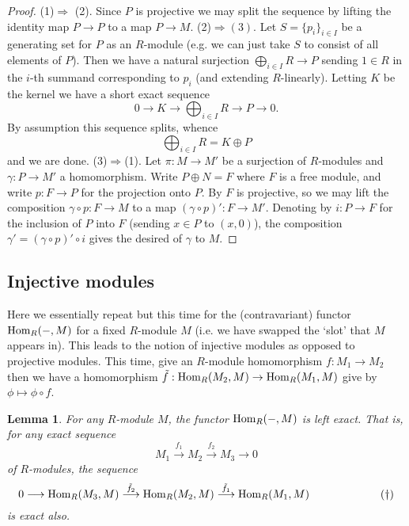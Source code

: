 \documentclass[11pt]{amsart}
\numberwithin{equation}{section}
\newtheorem{lemma}[equation]{Lemma}
\theoremstyle{remark}
\theoremstyle{remark}
\theoremstyle{remark}
\theoremstyle{definition}
\theoremstyle{definition}
\theoremstyle{definition}
\theoremstyle{definition}
\theoremstyle{definition}
\theoremstyle{definition}
\begin{document}
\begin{proof}
(1)$\Rightarrow$ (2).  Since $P$ is projective we may split the sequence by lifting the identity map $P\rightarrow P$ to a map $P\rightarrow M$. (2)$\Rightarrow (3)$. Let $S=\{p_i\}_{i\in I}$ be a generating set for $P$ as an $R$-module (e.g. we can just take $S$ to consist of all elements of $P$). Then we have a natural surjection $\bigoplus_{i\in I}R\rightarrow P$ sending  $1\in R$ in the $i$-th summand corresponding to $p_i$ (and extending $R$-linearly). Letting $K$ be the kernel we have a short exact sequence
\[0\rightarrow K \rightarrow \bigoplus_{i\in I}R \rightarrow P\rightarrow 0.\]
By assumption this sequence splits, whence 
\[\bigoplus_{i\in I}R=K\oplus P\]
and we are done. (3)$\Rightarrow$(1). Let $\pi:M\rightarrow M'$ be a surjection of $R$-modules and  $\gamma:P\rightarrow M'$ a homomorphism.  Write $P\oplus N=F$ where $F$ is a free module, and write $p:F\rightarrow P$ for the projection onto $P$. By  $F$ is projective, so we may lift the composition $\gamma \circ p:F\rightarrow M$ to a map $(\gamma \circ p)':F\rightarrow M'$. Denoting by $i:P\rightarrow  F$ for the inclusion of $P$ into $F$ (sending $x\in P$ to $(x,0)$), the composition $\gamma'=(\gamma \circ p)'\circ i$ gives the desired of $\gamma$ to $M$.
\end{proof}

\subsection{Injective modules}

Here we essentially repeat   but this time for the (contravariant) functor $\textup{Hom}_R(-,M)$ for a fixed $R$-module $M$ (i.e. we have swapped the `slot' that $M$ appears in). This leads to the notion of injective modules as opposed to projective modules. This time, give an $R$-module homomorphism $f:M_1\rightarrow M_2$ then we have a homomorphism
$\tilde{f}:\textup{Hom}_R(M_2,M)\rightarrow \textup{Hom}_R(M_1,M)$ give by $\phi \mapsto \phi \circ f$.

\begin{lemma}
For any $R$-module $M$, the functor $\textup{Hom}_R(-,M)$ is left exact. That is, for any exact sequence 
\[ M_1\stackrel{f_1}{\longrightarrow} M_2 \stackrel{f_2}{\longrightarrow} M_3\longrightarrow 0\] of $R$-modules, the sequence \[0\longrightarrow \textup{Hom}_R(M_3,M)\stackrel{\tilde{f}_2}{\longrightarrow} \textup{Hom}_R(M_2,M)\stackrel{\tilde{f}_1}{\longrightarrow} \textup{Hom}_R(M_1,M)\phantom{how do you do ag}(\dagger)\] is exact also.
\end{lemma}
\end{document}
